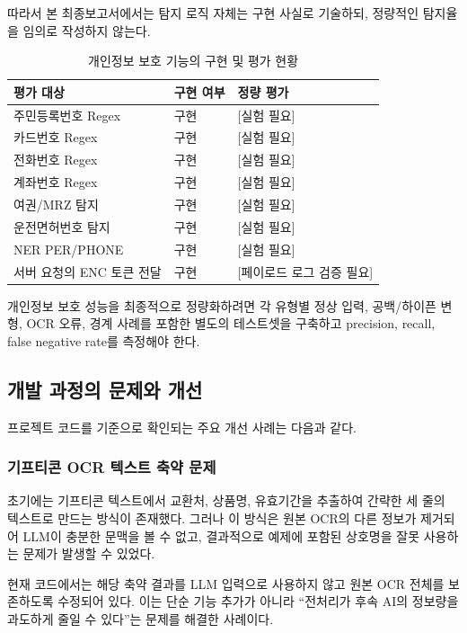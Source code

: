 \documentclass[11pt,a4paper]{article}
\begin{document}
따라서 본 최종보고서에서는 탐지 로직 자체는 구현 사실로 기술하되, 정량적인 탐지율을 임의로 작성하지 않는다.

\begin{table}[H]
\centering
\small
\begin{tabularx}{\linewidth}{l l l}
\toprule
\textbf{평가 대상} & \textbf{구현 여부} & \textbf{정량 평가}\\
\midrule
주민등록번호 Regex & 구현 & [실험 필요]\\
카드번호 Regex & 구현 & [실험 필요]\\
전화번호 Regex & 구현 & [실험 필요]\\
계좌번호 Regex & 구현 & [실험 필요]\\
여권/MRZ 탐지 & 구현 & [실험 필요]\\
운전면허번호 탐지 & 구현 & [실험 필요]\\
NER PER/PHONE & 구현 & [실험 필요]\\
서버 요청의 ENC 토큰 전달 & 구현 & [페이로드 로그 검증 필요]\\
\bottomrule
\end{tabularx}
\caption{개인정보 보호 기능의 구현 및 평가 현황}
\end{table}

개인정보 보호 성능을 최종적으로 정량화하려면 각 유형별 정상 입력, 공백/하이픈 변형, OCR 오류, 경계 사례를 포함한 별도의 테스트셋을 구축하고 precision, recall, false negative rate를 측정해야 한다.

\subsection{개발 과정의 문제와 개선}

프로젝트 코드를 기준으로 확인되는 주요 개선 사례는 다음과 같다.

\subsubsection{기프티콘 OCR 텍스트 축약 문제}

초기에는 기프티콘 텍스트에서 교환처, 상품명, 유효기간을 추출하여 간략한 세 줄의 텍스트로 만드는 방식이 존재했다. 그러나 이 방식은 원본 OCR의 다른 정보가 제거되어 LLM이 충분한 문맥을 볼 수 없고, 결과적으로 예제에 포함된 상호명을 잘못 사용하는 문제가 발생할 수 있었다.

현재 코드에서는 해당 축약 결과를 LLM 입력으로 사용하지 않고 원본 OCR 전체를 보존하도록 수정되어 있다. 이는 단순 기능 추가가 아니라 ``전처리가 후속 AI의 정보량을 과도하게 줄일 수 있다''는 문제를 해결한 사례이다.
\end{document}
